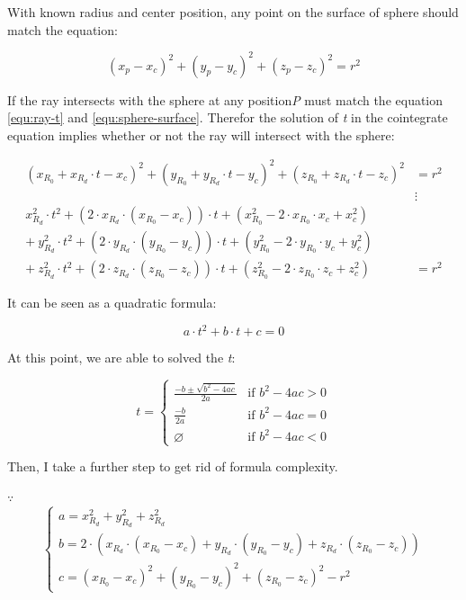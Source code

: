 With known radius and center position, any point on the surface of sphere should match the equation:

\begin{equation}\label{equ:sphere-surface}
(x_{p} - x_{c})^2 + (y_{p} - y_{c})^2 + (z_{p} - z_{c})^2 = r^2
\end{equation}

If the ray intersects with the sphere at any position\emph{P} must match the equation \ref{equ:ray-t} and \ref{equ:sphere-surface}. Therefor the solution of \emph{t} in the cointegrate equation implies whether or not the ray will intersect with the sphere:

\[
\begin{aligned}
(x_{R_{0}} + x_{R_{d}} \cdot t - x_{c})^2 + (y_{R_{0}} + y_{R_{d}} \cdot t - y_{c})^2 + (z_{R_{0}} + z_{R_{d}} \cdot t - z_{c})^2 &= r^2 \\
&\vdots \\
x_{R_{d}}^2 \cdot t^2 + (2 \cdot x_{R_{d}} \cdot (x_{R_{0}} - x_{c})) \cdot t + (x_{R_{0}}^2 - 2 \cdot x_{R_{0}}\cdot x_{c} + x_{c}^2) & \\
+\ y_{R_{d}}^2 \cdot t^2 + (2 \cdot y_{R_{d}} \cdot (y_{R_{0}} - y_{c})) \cdot t + (y_{R_{0}}^2 - 2 \cdot y_{R_{0}}\cdot y_{c} + y_{c}^2) & \\
+\ z_{R_{d}}^2 \cdot t^2 + (2 \cdot z_{R_{d}} \cdot (z_{R_{0}} - z_{c})) \cdot t + (z_{R_{0}}^2 - 2 \cdot z_{R_{0}}\cdot z_{c} + z_{c}^2) &= r^2
\end{aligned}
\]

It can be seen as a quadratic formula:

\begin{equation}\label{equ:sphere-surface-quadratic-formula}
a \cdot t^2 + b \cdot t + c = 0
\end{equation}

At this point, we are able to solved the \emph{t}:

\[
t =
\begin{cases}
\frac{-b \pm \sqrt{b^2 - 4ac}}{2a} & \text{if } b^2 - 4ac > 0 \\
\frac{-b}{2a} & \text{if } b^2 - 4ac = 0 \\
\varnothing & \text{if } b^2 - 4ac < 0
\end{cases}
\]

Then, I take a further step to get rid of formula complexity.

$\because$
\[
\left\{
\begin{array}{lr}
a = x_{R_{d}}^2 + y_{R_{d}}^2 + z_{R_{d}}^2 \\
b = 2 \cdot (x_{R_{d}} \cdot (x_{R_{0}} - x_{c}) + y_{R_{d}} \cdot (y_{R_{0}} - y_{c}) + z_{R_{d}} \cdot (z_{R_{0}} - z_{c})) \\
c = (x_{R_{0}} - x_{c})^2 + (y_{R_{0}} - y_{c})^2 + (z_{R_{0}} - z_{c})^2 - r^2
\end{array}
\right.
\]

